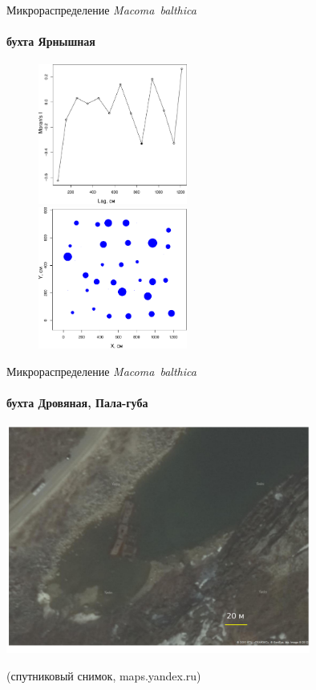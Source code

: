 \documentclass{beamer}
\begin{document}
\begin{frame}{Микрораспределение {\it Macoma~balthica}}
\framesubtitle{бухта Ярнышная}
\begin{figure}
\begin{minipage}[b]{.49\linewidth}
	\begin{center}
\includegraphics[width=49mm]{./microdistribution/Yarnyshnaya07_moran_N_Macoma_balthica_.pdf}
\end{center}
	\end{minipage}
	\hfil %
	\begin{minipage}[b]{.49\linewidth}
\begin{center}
\includegraphics[width=49mm]{./microdistribution/Yarnyshnaya_N_Macoma_bubbles.pdf}
	\end{center}
	\end{minipage}
\end{figure}
\end{frame}






\begin{frame}{Микрораспределение {\it Macoma~balthica}}
\framesubtitle{бухта Дровяная, Пала-губа}
\includegraphics[width=100mm]{./Pala_snimok.pdf}

(спутниковый снимок, maps.yandex.ru)
\end{frame}
\end{document}
